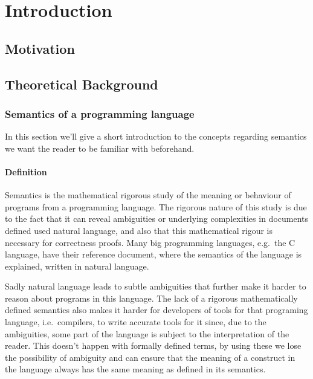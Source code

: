 \chapter{Introduction}\label{chapter:introduction}

\section{Motivation}

\section{Theoretical Background}

\subsection{Semantics of a programming language}

In this section we'll give a short introduction to the concepts regarding semantics we want the reader to be familiar with beforehand.

\subsubsection{Definition}

\begin{comment}
Maybe wanna rewrite this definition or find a source that backs it up?
\end{comment}
Semantics is the mathematical rigorous study of the meaning or behaviour of programs from a programming language.
The rigorous nature of this study is due to the fact that it can reveal ambiguities or underlying complexities in documents defined used natural language, and also that this mathematical rigour is necessary for correctness proofs.
Many big programming languages, e.g.\ the C language, have their reference document, where the semantics of the language is explained, written in natural language.

\begin{comment}
This part I took as an idea from reading the second part of Concrete Semantics
\end{comment}
Sadly natural language leads to subtle ambiguities that further make it harder to reason about programs in this language.
The lack of a rigorous mathematically defined semantics also makes it harder for developers of tools for that programing language, i.e.\ compilers, to write accurate tools for it since, due to the ambiguities, some part of the language is subject to the interpretation of the reader.
This doesn't happen with formally defined terms, by using these we lose the possibility of ambiguity and can ensure that the meaning of a construct in the language always has the same meaning as defined in its semantics.


